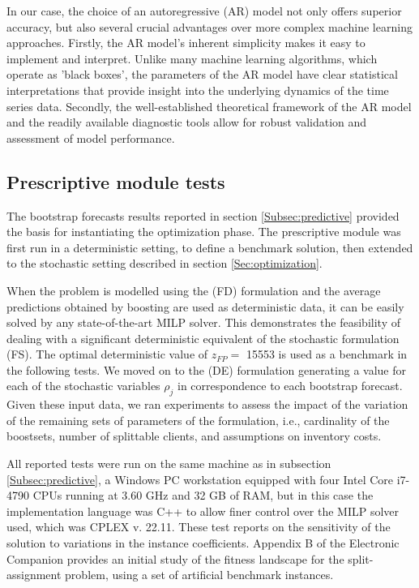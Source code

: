 \documentclass[11pt]{article}
\begin{document}
In our case, the choice of an autoregressive (AR) model not only offers superior accuracy, but also several crucial advantages over more complex machine learning approaches. Firstly, the AR model's inherent simplicity makes it easy to implement and interpret.  Unlike many machine learning algorithms, which operate as 'black boxes', the parameters of the AR model have clear statistical interpretations that provide insight into the underlying dynamics of the time series data. Secondly, the well-established theoretical framework of the AR model and the readily available diagnostic tools allow for robust validation and assessment of model performance.  

\subsection{Prescriptive module tests}  \label{Subsec:prescriptive}

The bootstrap forecasts results reported in section \ref{Subsec:predictive} provided the basis for instantiating the optimization phase. The prescriptive module was first run in a deterministic setting, to define a benchmark solution, then extended to the stochastic setting described in section \ref{Sec:optimization}.

When the problem is modelled using the (FD) formulation and the average predictions obtained by boosting are used as deterministic data, it can be easily solved by any state-of-the-art MILP solver. This demonstrates the feasibility of dealing with a significant deterministic equivalent of the stochastic formulation (FS). The optimal deterministic value of $z_{FP} =$ 15553 is used as a benchmark in the following tests.
We moved on to the (DE) formulation generating a value for each of the stochastic variables $\rho_j$ in correspondence to each bootstrap forecast.
Given these input data, we ran experiments to assess the impact of the variation of the remaining sets of parameters of the formulation, i.e., cardinality of the boostsets, number of splittable clients, and assumptions on inventory costs. 

All reported tests were run on the same machine as in subsection \ref{Subsec:predictive}, a Windows PC workstation equipped with four Intel Core i7-4790 CPUs running at 3.60 GHz and 32 GB of RAM, but in this case the implementation language was C++ to allow finer control over the MILP solver used, which was CPLEX v. 22.11.
These test reports on the sensitivity of the solution to variations in the instance coefficients. Appendix B of the Electronic Companion provides an initial study of the fitness landscape for the split-assignment problem, using a set of artificial benchmark instances.
\end{document}
